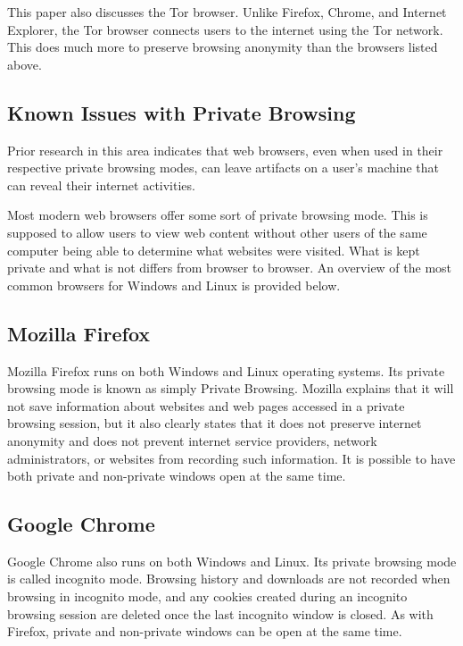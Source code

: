 \documentclass[pdftex,letterpaper,11pt]{article}
\begin{document}
    This paper also discusses the Tor browser. Unlike Firefox, Chrome, and
    Internet Explorer, the Tor browser connects users to the internet using the
    Tor network. This does much more to preserve browsing anonymity than the
    browsers listed above. %

    \subsection{Known Issues with Private Browsing}
    Prior research in this area indicates that web browsers, even when used in
    their respective private browsing modes, can leave artifacts on a user's
    machine that can reveal their internet activities. %

  \iffalse
  Most modern web browsers offer some sort of private browsing mode. This is
  supposed to allow users to view web content without other users of the same
  computer being able to determine what websites were visited. What is kept
  private and what is not differs from browser to browser. An overview of the
  most common browsers for Windows and Linux is provided below.

    \subsection{Mozilla Firefox}
    Mozilla Firefox runs on both Windows and Linux operating systems. Its
    private browsing mode is known as simply Private Browsing. Mozilla explains
    that it will not save information about websites and web pages accessed in
    a private browsing session, but it also clearly states that it does not
    preserve internet anonymity and does not prevent internet service
    providers, network administrators, or websites from recording such
    information. It is possible to have both private and non-private windows
    open at the same time.\cite{verdi13}

    \subsection{Google Chrome}
    Google Chrome also runs on both Windows and Linux. Its private browsing
    mode is called incognito mode. Browsing history and downloads are not
    recorded when browsing in incognito mode, and any cookies created during
    an incognito browsing session are deleted once the last incognito window is
    closed. As with Firefox, private and non-private windows can be open at the
    same time.\cite{google13}
\end{document}
